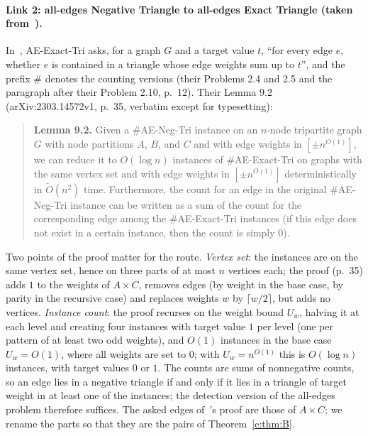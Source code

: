 \documentclass[11pt]{article}
\theoremstyle{definition}
\theoremstyle{remark}
\begin{document}
\paragraph{Link 2: all-edges Negative Triangle to all-edges Exact Triangle (taken from~\cite{CVX23}).} In~\cite{CVX23}, AE-Exact-Tri asks, for a graph $G$ and a target value $t$, ``for every edge $e$, whether $e$ is contained in a triangle whose edge weights sum up to $t$'', and the prefix \# denotes the counting versions (their Problems 2.4 and 2.5 and the paragraph after their Problem 2.10, p.~12). Their Lemma 9.2 (arXiv:2303.14572v1, p.~35, verbatim except for typesetting):
\begin{quote}
\textbf{Lemma 9.2.} Given a \#AE-Neg-Tri instance on an $n$-node tripartite graph $G$ with node partitions $A$, $B$, and $C$ and with edge weights in $[\pm n^{O(1)}]$, we can reduce it to $O(\log n)$ instances of \#AE-Exact-Tri on graphs with the same vertex set and with edge weights in $[\pm n^{O(1)}]$ deterministically in $\tilde O(n^2)$ time. Furthermore, the count for an edge in the original \#AE-Neg-Tri instance can be written as a sum of the count for the corresponding edge among the \#AE-Exact-Tri instances (if this edge does not exist in a certain instance, then the count is simply 0).
\end{quote}
Two points of the proof matter for the route. \emph{Vertex set}: the instances are on the same vertex set, hence on three parts of at most $n$ vertices each; the proof (p.~35) adds $1$ to the weights of $A\times C$, removes edges (by weight in the base case, by parity in the recursive case) and replaces weights $w$ by $\lceil w/2\rceil$, but adds no vertices. \emph{Instance count}: the proof recurses on the weight bound $U_w$, halving it at each level and creating four instances with target value $1$ per level (one per pattern of at least two odd weights), and $O(1)$ instances in the base case $U_w=O(1)$, where all weights are set to $0$; with $U_w=n^{O(1)}$ this is $O(\log n)$ instances, with target values $0$ or $1$. The counts are sums of nonnegative counts, so an edge lies in a negative triangle if and only if it lies in a triangle of target weight in at least one of the instances; the detection version of the all-edges problem therefore suffices. The asked edges of~\cite{CVX23}'s proof are those of $A\times C$; we rename the parts so that they are the pairs of Theorem~\ref{e:thm:B}.
\end{document}
